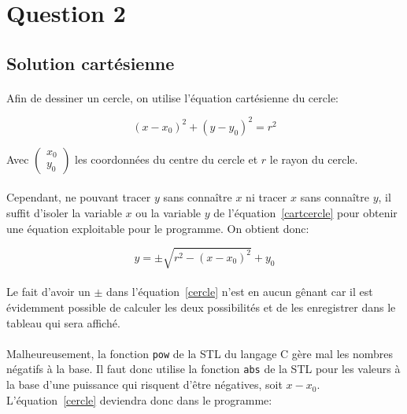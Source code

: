 \documentclass{report}
\begin{document}
\section{Question 2}
\subsection{Solution cartésienne}

\paragraph{} Afin de dessiner un cercle, on utilise l'équation cartésienne du
cercle:

\begin{equation}
	{\left(x-x_0\right)}^2 + {\left(y-y_0\right)}^2 = r^2
	\label{cartcercle}
\end{equation}

Avec
$ \begin{pmatrix}
	x_0\\y_0
\end{pmatrix} $
les coordonnées du centre du cercle et $r$ le rayon du cercle.

\paragraph{} Cependant, ne pouvant tracer $y$ sans connaître $x$ ni tracer $x$
sans connaître $y$, il suffit d'isoler la variable $x$ ou la variable $y$ de
l'équation~\ref{cartcercle} pour obtenir une équation exploitable pour le
programme.  On obtient donc:

\begin{equation}
	y = \pm \sqrt{r^2 - {\left(x-x_0\right)}^2} + y_0
	\label{cercle}
\end{equation}

\paragraph{} Le fait d'avoir un $\pm$ dans l'équation~\ref{cercle} n'est en
aucun gênant car il est évidemment possible de calculer les deux possibilités
et de les enregistrer dans le tableau qui sera affiché.

\paragraph{} Malheureusement, la fonction \texttt{pow} de la STL du langage C
gère mal les nombres négatifs à la base. Il faut donc utilise la fonction
\texttt{abs} de la STL pour les valeurs à la base d'une puissance qui risquent
d'être négatives, soit $x-x_0$. L'équation~\ref{cercle} deviendra donc dans le
programme:
\end{document}
